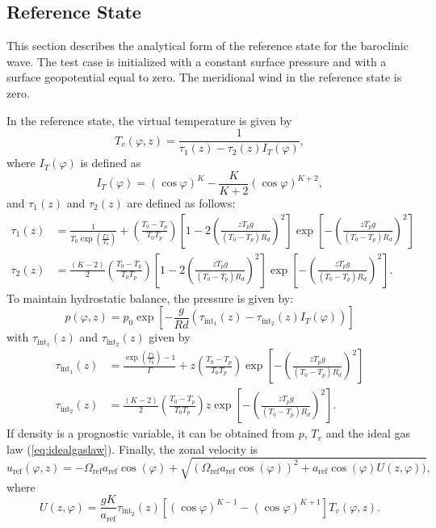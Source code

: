 \documentclass[times,doublespace]{fldauth}
\begin{document}
\begin{table}[h]
\end{table}

\subsection{Reference State}

This section describes the analytical form of the reference state for the baroclinic wave.  The test case is initialized with a constant surface pressure and with a surface geopotential equal to zero.  The meridional wind in the reference state is zero. 

In the reference state, the virtual temperature is given by
\begin{equation}
T_v(\varphi, z) = \frac{1}{\tau_1(z)-\tau_2(z) I_T(\varphi)},
\label{virtTemp}
\end{equation} where $I_T(\varphi)$ is defined as
\begin{equation}
I_{T}(\varphi) =(\cos \varphi )^K-\frac{K}{K+2}(\cos \varphi )^{K+2},
\end{equation} and $\tau_1(z)$ and $\tau_2(z)$ are defined as follows:
\begin{align}
\tau_1(z) &= \frac{1}{T_0\exp\left(\frac{\Gamma z}{T_0}\right)} + \left( \frac{T_0-T_p}{T_0T_p} \right)\left[1-2\left(\frac{zT_pg}{(T_0-T_p)R_d}\right)^2\right] \exp\left[-\left(\frac{zT_pg}{(T_0-T_p)R_d}\right)^2\right] \\
\tau_2(z) &= \frac{(K-2)}{2} \left( \frac{T_0-T_p}{T_0T_p} \right) \left[1-2\left(\frac{zT_pg}{(T_0-T_p)R_d}\right)^2\right] \exp\left[-\left(\frac{zT_pg}{(T_0-T_p)R_d}\right)^2\right].
\end{align}  To maintain hydrostatic balance, the pressure is given by:
\begin{equation}
p(\varphi, z) = p_0\exp \left[ -\frac{g}{Rd}(\tau_{\text{int}_1}(z) -\tau_{\text{int}_2}(z) I_T(\varphi) ) \right]
\end{equation} with $\tau_{\text{int}_1}(z)$ and $\tau_{\text{int}_2}(z)$ given by
\begin{align}
\tau_{\text{int}_1}(z) &=\frac{\exp\left( \frac{\Gamma z}{T_0} \right)-1}{\Gamma} + z \left(\frac{T_0-T_p}{T_0T_p} \right) \exp\left[-\left(\frac{zT_pg}{(T_0-T_p)R_d}\right)^2\right] \\
\tau_{\text{int}_2}(z) &=\frac{(K-2)}{2} \left(\frac{T_0-T_p}{T_0T_p} \right) z \exp\left[-\left(\frac{zT_pg}{(T_0-T_p)R_d}\right)^2\right].
\end{align}  If density is a prognostic variable, it can be obtained from $p$, $T_v$ and the ideal gas law (\ref{eq:idealgaslaw}).  Finally, the zonal velocity is
\begin{equation}
u_{\text{ref}}(\varphi, z) = -\Omega_{\text{ref}} a_{\text{ref}} \cos(\varphi)+\sqrt{(\Omega_{\text{ref}} a_{\text{ref}} \cos(\varphi))^2+ a_{\text{ref}} \cos(\varphi)U(z,\varphi))},
\end{equation} where
\begin{equation}
U(z, \varphi) = \frac{g K}{a_{\text{ref}}} \tau_{\text{int}_2}(z) \left[ (\cos \varphi)^{K - 1} - (\cos \varphi)^{K + 1} \right] T_v(\varphi, z).
\end{equation} 
\end{document}
